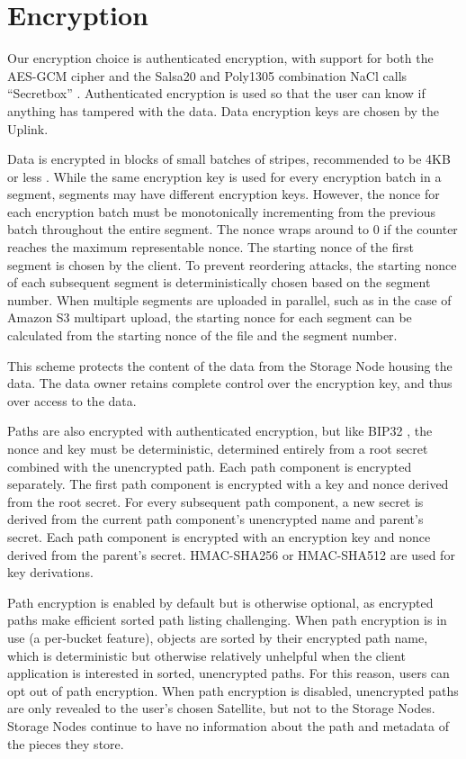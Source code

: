 \documentclass[8pt,fleqn,openany]{book}
\begin{document}
\section{Encryption}\label{sec:concrete-encryption}

Our encryption choice is authenticated encryption, with support for both the
AES-GCM cipher and the Salsa20 and Poly1305 combination NaCl calls ``Secretbox''
\cite{nacl-crypto}. Authenticated encryption is used so that the user can know
if anything has tampered with the data. Data encryption keys are chosen by the
Uplink.

Data is encrypted in blocks of small batches of stripes, recommended to be
4KB or less \cite{nacl-packetlen}. While the same encryption key is used for
every encryption batch in a segment, segments may have
different encryption keys. However, the nonce for each encryption
batch must be monotonically incrementing from the previous batch throughout the
entire segment. The nonce wraps around to 0 if the counter reaches the
maximum representable nonce.
The starting nonce of the first segment is chosen by the client.
To prevent reordering attacks, the starting nonce of each
subsequent segment is deterministically chosen based on the segment number.
When multiple segments are uploaded in parallel, such as in the case of
Amazon S3 multipart upload, the starting nonce for each segment can be
calculated from the starting nonce of the file and the segment number.

This scheme protects the
content of the data from the Storage Node housing the data. The data owner
retains complete control over the encryption key, and thus over access to the
data.

Paths are also encrypted with authenticated encryption, but like
BIP32 \cite{bip32}, the nonce and key
must be deterministic, determined entirely from a root secret combined with the
unencrypted path. Each path component is encrypted separately.
The first path component is encrypted with a key and nonce derived from the
root secret. For every subsequent path component, a new secret is derived from
the current path component's unencrypted name and parent's secret. Each path
component is encrypted with an encryption key and nonce derived from the
parent's secret. HMAC-SHA256 or HMAC-SHA512 are used for key derivations.

Path encryption is enabled by default but is otherwise optional, as encrypted
paths make efficient sorted path listing challenging.
When path encryption is in use (a per-bucket feature),
objects are sorted by their encrypted path name, which is deterministic
but otherwise relatively unhelpful
when the client application is interested in sorted, unencrypted paths.
For this reason, users can opt out of
path encryption. When path encryption is disabled, unencrypted paths
are only revealed to the user's chosen Satellite, but not to the Storage
Nodes. Storage Nodes continue to have no information about the path and
metadata of the pieces they store.
\end{document}
